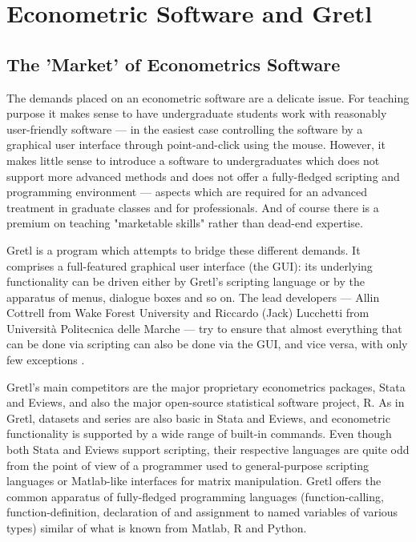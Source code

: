\documentclass[11pt]{article}
\newcommand{\remph}[1]{{\color{myred}#1}}
\begin{document}
\section{Econometric Software and Gretl}

\subsection{The 'Market' of Econometrics Software}
The demands placed on an econometric software are a delicate issue. For teaching purpose it makes sense to have undergraduate students work with reasonably user-friendly software --- in the easiest case controlling the software by a graphical user interface through point-and-click using the mouse. However, it makes little sense to introduce a software to undergraduates which does not support more advanced methods and does not offer a fully-fledged scripting and programming environment --- aspects which are required for an advanced treatment in graduate classes and for professionals. And of course there is a premium on teaching "marketable skills" rather than dead-end expertise.

Gretl is a program which attempts to bridge these different demands. It comprises a full-featured graphical user interface (the GUI): its underlying
functionality can be driven either by Gretl's scripting language or by the apparatus of menus, dialogue boxes and so on. The lead developers --- Allin Cottrell from Wake Forest University and Riccardo (Jack) Lucchetti from Università Politecnica delle Marche --- try to ensure that almost everything that can be done via scripting can also be done via the GUI, and vice versa, with only few exceptions \citep{Cottrell2017}.

Gretl's main competitors are the major proprietary econometrics packages, Stata and Eviews, and also the major open-source statistical software project, R. As in Gretl, datasets and series are also basic in Stata and Eviews, and econometric functionality is supported by a wide range of built-in commands. Even though both Stata and Eviews support scripting, their respective languages are quite odd from the point of view of a programmer used to general-purpose scripting languages or Matlab-like interfaces for matrix manipulation. %
Gretl offers the common apparatus of fully-fledged programming languages (function-calling, function-definition, declaration of and assignment to named variables of various types) similar of what is known from Matlab, R and Python.
\end{document}
